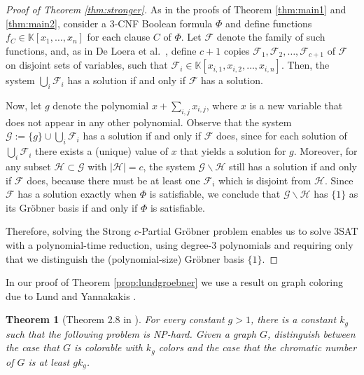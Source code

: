 \documentclass{article}
\newcommand{\F}[0]{\mathcal{F}}
\newcommand{\G}[0]{\mathcal{G}}
\newcommand{\Hh}[0]{\mathcal{H}}
\newcommand{\K}[0]{\mathbb{K}}
\newtheorem{thm}{Theorem}
\begin{document}
\begin{proof}[Proof of Theorem \ref{thm:stronger}]
As in the proofs of Theorem \ref{thm:main1} and \ref{thm:main2}, consider a 3-CNF Boolean formula $\Phi$ and define functions $f_C \in \K[x_1,\ldots,x_n]$ for each clause $C$ of $\Phi$. Let $\F$ denote the family of such functions, and, as in De Loera et al.~\cite{deloera}, define $c+1$ copies $\F_1, \F_2, \ldots, \F_{c+1}$ of $\F$ on disjoint sets of variables, such that $\F_i\in \K[x_{i,1}, x_{i, 2}, \ldots, x_{i, n}]$. Then, the system $\bigcup_i \F_i$ has a solution if and only if $\F$ has a solution.

Now, let $g$ denote the polynomial $x + \sum_{i, j} x_{i, j}$, where $x$ is a new variable that does not appear in any other polynomial. Observe that the system $\G := \{g\} \cup \bigcup_i \F_i$ has a solution if and only if $\F$ does, since for each solution of $\bigcup_i \F_i$ there exists a (unique) value of $x$ that yields a solution for $g$.  Moreover, for any subset $\Hh\subset \G$ with $|\Hh| = c$, the system $\G \backslash \Hh$ still has a solution if and only if $\F$ does, because there must be at least one $\F_i$ which is disjoint from $\Hh$. Since $\F$ has a solution exactly when $\Phi$ is satisfiable, we conclude that $\G \backslash \Hh$ has $\{1\}$ as its Gr\"obner basis if and only if $\Phi$ is satisfiable.

Therefore, solving the Strong $c$\nobreakdash-Partial Gr\"obner problem enables us to solve 3SAT with a polynomial-time reduction, using degree-3 polynomials and requiring only that we distinguish the (polynomial-size) Gr\"obner basis $\{1\}$. 
\end{proof}

In our proof of Theorem \ref{prop:lundgroebner} we use a result on graph coloring due to Lund and Yannakakis \cite{lund}.

\begin{thm}[Theorem 2.8 in \cite{lund}]\label{lundy}  For every constant $g>1$, there is a constant $k_g$ such that the following problem is NP-hard. Given a graph $G$, distinguish between the case that $G$ is colorable with $k_g$ colors and the case that the chromatic number of $G$ is at least $gk_g$.
\end{thm}
\end{document}
